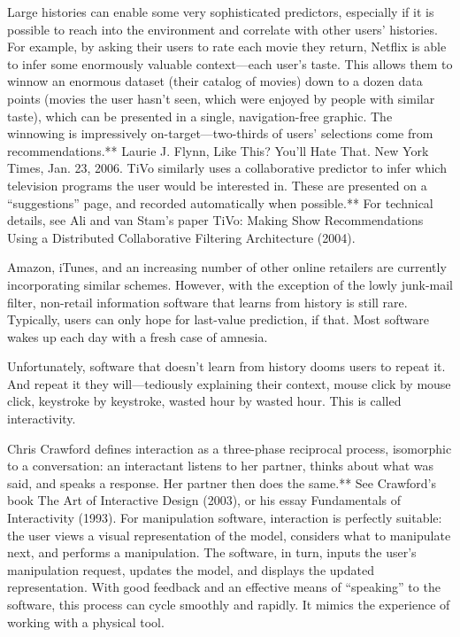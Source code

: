 {Large histories can enable some very sophisticated predictors, especially if it is possible to reach into the environment and correlate with other users’ histories. For example, by asking their users to rate each movie they return, Netflix is able to infer some enormously valuable context—each user’s taste. This allows them to winnow an enormous dataset (their catalog of movies) down to a dozen data points (movies the user hasn’t seen, which were enjoyed by people with similar taste), which can be presented in a single, navigation-free graphic. The winnowing is impressively on-target—two-thirds of users’ selections come from recommendations.** Laurie J. Flynn, Like This? You’ll Hate That. New York Times, Jan. 23, 2006. TiVo similarly uses a collaborative predictor to infer which television programs the user would be interested in. These are presented on a “suggestions” page, and recorded automatically when possible.** For technical details, see Ali and van Stam’s paper TiVo: Making Show Recommendations Using a Distributed Collaborative Filtering Architecture (2004).

Amazon, iTunes, and an increasing number of other online retailers are currently incorporating similar schemes. However, with the exception of the lowly junk-mail filter, non-retail information software that learns from history is still rare. Typically, users can only hope for last-value prediction, if that. Most software wakes up each day with a fresh case of amnesia.

Unfortunately, software that doesn’t learn from history dooms users to repeat it. And repeat it they will—tediously explaining their context, mouse click by mouse click, keystroke by keystroke, wasted hour by wasted hour. This is called interactivity.

Chris Crawford defines interaction as a three-phase reciprocal process, isomorphic to a conversation: an interactant listens to her partner, thinks about what was said, and speaks a response. Her partner then does the same.** See Crawford’s book The Art of Interactive Design (2003), or his essay Fundamentals of Interactivity (1993). For manipulation software, interaction is perfectly suitable: the user views a visual representation of the model, considers what to manipulate next, and performs a manipulation. The software, in turn, inputs the user’s manipulation request, updates the model, and displays the updated representation. With good feedback and an effective means of “speaking” to the software, this process can cycle smoothly and rapidly. It mimics the experience of working with a physical tool.

}
